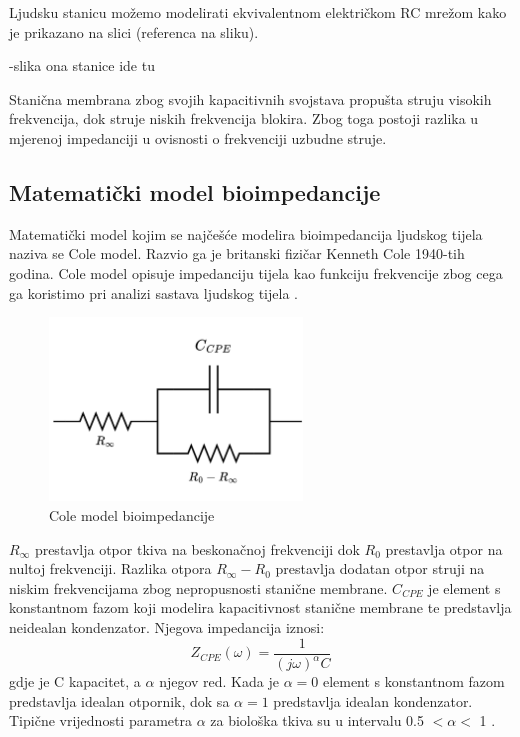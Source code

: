 \documentclass[../diplomski_rad.tex]{subfiles}
\begin{document}
Ljudsku stanicu možemo modelirati ekvivalentnom električkom RC mrežom \cite{Lukaski2013} kako je prikazano na slici (referenca na sliku).

-slika ona stanice ide tu

Stanična membrana zbog svojih kapacitivnih svojstava propušta struju visokih frekvencija, dok struje niskih frekvencija blokira. 
Zbog toga postoji razlika u mjerenoj impedanciji u ovisnosti o frekvenciji uzbudne struje.  


\subsection{Matematički model bioimpedancije}

Matematički model kojim se najčešće modelira bioimpedancija ljudskog tijela naziva se Cole model. 
Razvio ga je britanski fizičar Kenneth Cole 1940-tih godina. 
Cole model opisuje impedanciju tijela kao funkciju frekvencije zbog cega ga koristimo pri analizi sastava ljudskog tijela \cite{Freeborn2021}.

\begin{figure}[htb]
    \centering
    \includegraphics[width=0.6\textwidth]{Figures/cole_model.png} 
    \caption{Cole model bioimpedancije}
    \label{slk:cole_model}
\end{figure}

$R_{\infty}$ prestavlja otpor tkiva na beskonačnoj frekvenciji dok $R_{0}$ prestavlja otpor na nultoj frekvenciji. 
Razlika otpora $R_{\infty}-R_{0}$ prestavlja dodatan otpor struji na niskim frekvencijama zbog nepropusnosti stanične membrane. 
$C_{CPE}$ je element s konstantnom fazom koji modelira kapacitivnost stanične membrane 
te predstavlja neidealan kondenzator. Njegova impedancija iznosi: 
\begin{equation}
    \label{jed:cpe}
    Z_{CPE}(\omega) = \frac{1}{(j\omega)^{\alpha}C}
\end{equation} 
gdje je C kapacitet, a $\alpha$ njegov red. Kada je $\alpha = 0$ element s konstantnom fazom predstavlja idealan otpornik, 
dok sa $\alpha = 1$ predstavlja idealan kondenzator. 
Tipične vrijednosti parametra $\alpha$ za biološka tkiva su u intervalu 0.5 $< \alpha <$ 1 \cite{Freeborn2021}.
\end{document}
